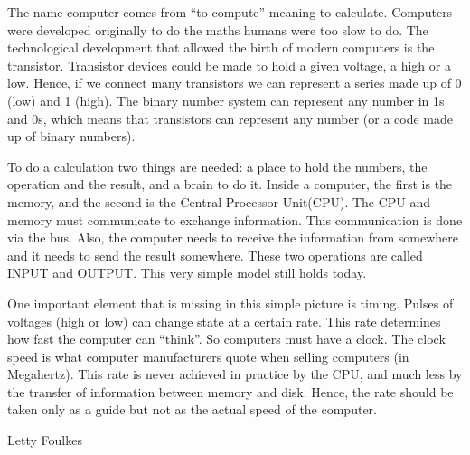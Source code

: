 \documentclass[blank]{impletter}
\begin{document}
The name computer comes from ``to compute'' meaning to
calculate. Computers were developed originally to do the maths humans
were too slow to do. The technological development that allowed the
birth of modern computers is the transistor. Transistor devices could
be made to hold a given voltage, a high or a low. Hence, if we connect
many transistors we can represent a series made up of 0 (low) and 1
(high). The binary number system can represent any number in 1s and
0s, which means that transistors can represent any number (or a code
made up of binary numbers).

To do a calculation two things are needed: a place to hold the
numbers, the operation and the result, and a brain to do it. Inside a
computer, the first is the memory, and the second is the Central
Processor Unit(CPU). The CPU and memory must communicate to exchange
information. This communication is done via the bus. Also, the
computer needs to receive the information from somewhere and it needs
to send the result somewhere. These two operations are called INPUT
and OUTPUT. This very simple model still holds today.

One important element that is missing in this simple picture is
timing. Pulses of voltages (high or low) can change state at a certain
rate. This rate determines how fast the computer can ``think''. So
computers must have a clock. The clock speed is what computer
manufacturers quote when selling computers (in Megahertz). This rate
is never achieved in practice by the CPU, and much less by the
transfer of information between memory and disk. Hence, the rate
should be taken only as a guide but not as the actual speed of the
computer.

{
Letty Foulkes
}
\end{document}
